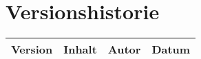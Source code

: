 \chapter*{Versionshistorie}
\begin{table}[htb]
	\begin{tabularx}{\textwidth}{|c|X|l|c|}
		\hline
\textbf{Version} & \textbf{Inhalt} & \textbf{Autor} & \textbf{Datum} \\ \hline

	\end{tabularx}
\end{table}
